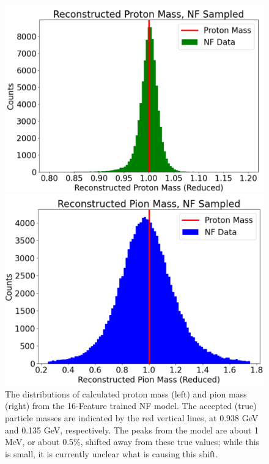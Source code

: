 \begin{figure}[htb]
    \centering
     \begin{minipage}{0.2349\textwidth}
        \centering
        \includegraphics[width=.97\textwidth,trim={ 0 0 0 0},clip]{Chapters/Ch3-Simulations/normalizing_flows/pics/FinalPictures/updated_proton_reduced.png}

    \end{minipage}
    \begin{minipage}{0.21245\textwidth}
        \centering
        
        \includegraphics[width=.97\textwidth,trim={ 0 0 0 0},clip]{Chapters/Ch3-Simulations/normalizing_flows/pics/FinalPictures/updated_pion_reduced.png}
    \end{minipage}
        \caption{The distributions of calculated proton mass (left) and pion mass (right) from the 16-Feature trained NF model.  The accepted (true) particle masses are indicated by the red vertical lines, at 0.938 GeV and 0.135 GeV, respectively.
        The peaks from the model are about 1 MeV, or about 0.5\%, shifted away from these true values; while this is small, it is currently unclear what is causing this shift.}
    \label{fig:protonspions}
\end{figure}


